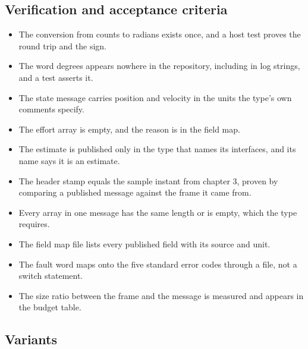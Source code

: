 \subsection*{Verification and acceptance criteria}

\begin{itemize}
\item The conversion from counts to radians exists once, and a host test proves
the round trip and the sign.
\item The word degrees appears nowhere in the repository, including in log
strings, and a test asserts it.
\item The state message carries position and velocity in the units the type's own
comments specify.
\item The effort array is empty, and the reason is in the field map.
\item The estimate is published only in the type that names its interfaces, and
its name says it is an estimate.
\item The header stamp equals the sample instant from chapter 3, proven by
comparing a published message against the frame it came from.
\item Every array in one message has the same length or is empty, which the
type requires.
\item The field map file lists every published field with its source and unit.
\item The fault word maps onto the five standard error codes through a file, not
a switch statement.
\item The size ratio between the frame and the message is measured and appears in
the budget table.
\end{itemize}

\subsection*{Variants}

